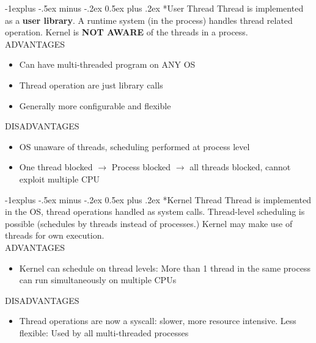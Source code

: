 \documentclass[10pt,landscape]{article}
\makeatletter
\renewcommand{\subsection}{\@startsection{section}{1}{0mm}%
                                {-1ex plus -.5ex minus -.2ex}%
                                {0.5ex plus .2ex}%
                                {\normalfont\large\bfseries}}
\renewcommand{\subsection}{\@startsection{subsection}{2}{0mm}%
                                {-1explus -.5ex minus -.2ex}%
                                {0.5ex plus .2ex}%
                                {\normalfont\normalsize\bfseries}}
\makeatother
\begin{document}
\begin{multicols*}{3}
\subsection*{User Thread}
Thread is implemented as a \textbf{user library}. A runtime system (in the process) handles thread related operation.
Kernel is \textbf{NOT AWARE} of the threads in a process. \\

ADVANTAGES
\begin{itemize}[topsep=0pt,noitemsep,wide=0pt, leftmargin=\dimexpr{} + 2\relax]
    \item Can have multi-threaded program on ANY OS
    \item Thread operation are just library calls
    \item Generally more configurable and flexible
\end{itemize}

DISADVANTAGES
\begin{itemize}[topsep=0pt,noitemsep,wide=0pt, leftmargin=\dimexpr{} + 2\relax]
    \item OS unaware of threads, scheduling performed at process level
    \item One thread blocked $\rightarrow$ Process blocked $\rightarrow$ all threads blocked, cannot exploit multiple CPU
\end{itemize}

\subsection*{Kernel Thread}
Thread is implemented in the OS, thread operations handled as system calls. Thread-level scheduling
is possible (schedules by threads instead of processes.) Kernel may make use of threads
for own execution. \\

ADVANTAGES
\begin{itemize}[topsep=0pt,noitemsep,wide=0pt, leftmargin=\dimexpr{} + 2\relax]
    \item Kernel can schedule on thread levels: More than 1 thread in the same process can run simultaneously on multiple CPUs
\end{itemize}

DISADVANTAGES
\begin{itemize}[topsep=0pt,noitemsep,wide=0pt, leftmargin=\dimexpr{} + 2\relax]
    \item Thread operations are now a syscall: slower, more resource intensive. Less flexible: Used by all multi-threaded processes
\end{itemize}


\end{multicols*}
\end{document}
